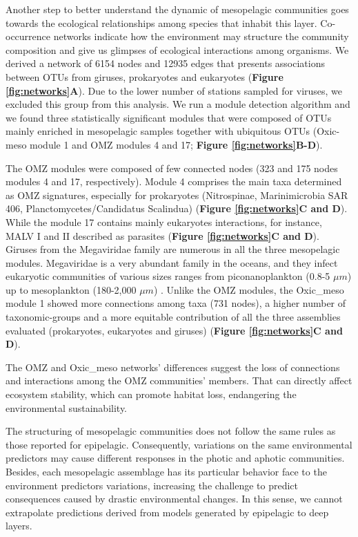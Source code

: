 \documentclass[fleqn,10pt]{wlscirep}
\begin{document}
Another step to better understand the dynamic of mesopelagic communities goes towards the ecological relationships among species that inhabit this layer. Co-occurrence networks indicate how the environment may structure the community composition and give us glimpses of ecological interactions among organisms. We derived a network of 6154 nodes and 12935 edges that presents associations between OTUs from giruses, prokaryotes and eukaryotes (\textbf{Figure \ref{fig:networks}A}). Due to the lower number of stations sampled for viruses, we excluded this group from this analysis. We run a module detection algorithm and we found three statistically significant modules that were composed of OTUs mainly enriched in mesopelagic samples together with ubiquitous OTUs (Oxic-meso module 1 and OMZ modules 4 and 17; \textbf{Figure \ref{fig:networks}B-D}).

The OMZ modules were composed of few connected nodes (323 and 175 nodes modules 4 and 17, respectively). Module 4 comprises the main taxa determined as OMZ signatures, especially for prokaryotes (Nitrospinae, Marinimicrobia SAR 406, Planctomycetes/Candidatus Scalindua) (\textbf{Figure \ref{fig:networks}C and D}). While the module 17 contains mainly eukaryotes interactions, for instance, MALV I and II described as parasites (\textbf{Figure \ref{fig:networks}C and D}). Giruses from the Megaviridae family are numerous in all the three mesopelagic modules. Megaviridae is a very abundant family in the oceans, and they infect eukaryotic communities of various sizes ranges from piconanoplankton (0.8-5 $\mu m$) up to mesoplankton (180-2,000 $\mu m$) \cite{mihara_taxon_2018, endo_biogeography_2020}. Unlike the OMZ modules, the Oxic\_meso module 1 showed more connections among taxa (731 nodes), a higher number of taxonomic-groups and a more equitable contribution of all the three assemblies evaluated (prokaryotes, eukaryotes and giruses) (\textbf{Figure \ref{fig:networks}C and D}). 

The OMZ and Oxic\_meso networks' differences suggest the loss of connections and interactions among the OMZ communities' members. That can directly affect ecosystem stability, which can promote habitat loss, endangering the environmental sustainability.

The structuring of mesopelagic communities does not follow the same rules as those reported for epipelagic. Consequently, variations on the same environmental predictors may cause different responses in the photic and aphotic communities. Besides, each mesopelagic assemblage has its particular behavior face to the environment predictors variations, increasing the challenge to predict consequences caused by drastic environmental changes. In this sense, we cannot extrapolate predictions derived from models generated by epipelagic to deep layers.
\end{document}

